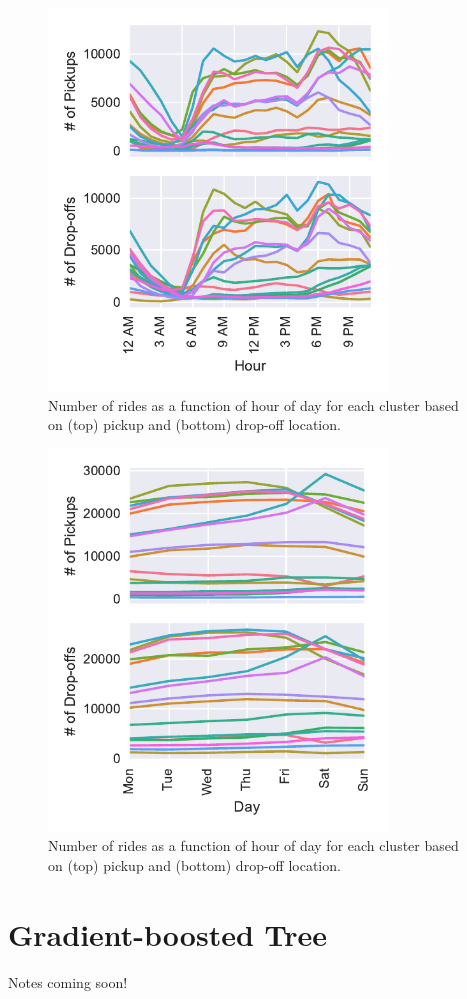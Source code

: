 \documentclass[twocolumn,10pt]{article}
\begin{document}
\begin{figure}
\centering
\includegraphics[width=90mm]{ClusterCountHour}
\caption{Number of rides as a function of hour of day for each cluster based on (top) pickup and (bottom) drop-off location.}
\label{fig:ClusterCountHour}
\end{figure}

\begin{figure}
\centering
\includegraphics[width=90mm]{ClusterCountDaily}
\caption{Number of rides as a function of hour of day for each cluster based on (top) pickup and (bottom) drop-off location.}
\label{fig:ClusterCountDaily}
\end{figure}
\section{Gradient-boosted Tree}
Notes coming soon!
\end{document}
